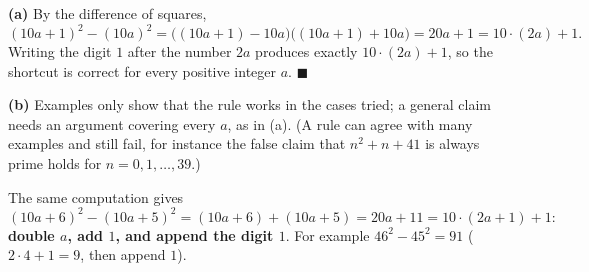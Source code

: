 \textbf{(a)} By the difference of squares,
\[(10a+1)^2-(10a)^2=\bigl((10a+1)-10a\bigr)\bigl((10a+1)+10a\bigr)=20a+1=10\cdot(2a)+1 .\]
Writing the digit $1$ after the number $2a$ produces exactly $10\cdot(2a)+1$, so the shortcut is correct for every positive integer $a$. $\blacksquare$

\textbf{(b)} Examples only show that the rule works in the cases tried; a general claim needs an argument covering every $a$, as in (a). (A rule can agree with many examples and still fail, for instance the false claim that $n^2+n+41$ is always prime holds for $n=0,1,\ldots,39$.)

The same computation gives
\[(10a+6)^2-(10a+5)^2=(10a+6)+(10a+5)=20a+11=10\cdot(2a+1)+1:\]
\textbf{double $a$, add $1$, and append the digit $1$}. For example $46^2-45^2=91$ ($2\cdot4+1=9$, then append $1$).
